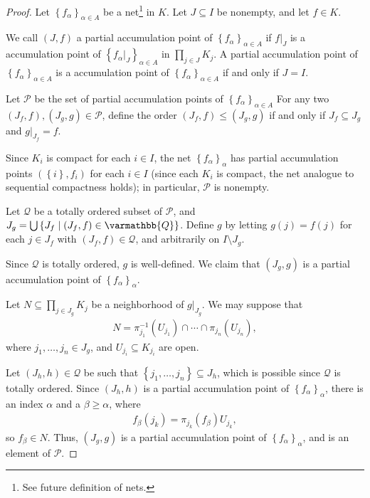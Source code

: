 \documentclass[12pt]{extarticle}
\newcommand{\Q}{\mathbb{Q}}
\newcommand{\set}[1]{\left\{#1\right\}}
\theoremstyle{plain}
\theoremstyle{definition}
\theoremstyle{note}
\renewcommand*{\mathbb}[1]{\varmathbb{#1}}
\renewcommand{\newline}{\hfill\break}
\begin{document}
\begin{proof}
  Let $\set{f_{\alpha}}_{\alpha\in A}$ be a net\footnote{See future definition of nets.} in $K$. Let $J\subseteq I$ be nonempty, and let $f\in K$.\newline

  We call $\left(J,f\right)$ a partial accumulation point of $\set{f_{\alpha}}_{\alpha \in A}$ if $f\vert_{J}$ is a accumulation point of $\set{f_{\alpha}\vert_{J}}_{\alpha \in A}$ in $\displaystyle \prod_{j\in J}K_j$. A partial accumulation point of $\set{f_{\alpha}}_{\alpha \in A}$ is a accumulation point of $\set{f_{\alpha}}_{\alpha\in A}$  if and only if $J = I$.\newline

  Let $\mathcal{P}$ be the set of partial accumulation points of $\set{f_{\alpha}}_{\alpha \in A}$ For any two $\left(J_f,f\right),\left(J_g,g\right)\in \mathcal{P}$, define the order $\left(J_f,f\right)\leq \left(J_g,g\right)$ if and only if $J_f\subseteq J_g$ and $g\vert_{J_f} = f$.\newline

  Since $K_i$ is compact for each $i\in I$, the net $\set{f_{\alpha}}_{\alpha}$ has partial accumulation points $\left(\set{i},f_i\right)$ for each $i\in I$ (since each $K_i$ is compact, the net analogue to sequential compactness holds); in particular, $\mathcal{P}$ is nonempty.\newline

  Let $\mathcal{Q}$ be a totally ordered subset of $\mathcal{P}$, and $J_g = \bigcup\set{J_f\mid \left(J_f,f\right)\in \Q}$. Define $g$ by letting $g(j) = f(j)$ for each $j\in J_f$ with $\left(J_f,f\right)\in \mathcal{Q}$, and arbitrarily on $I\setminus J_g$.\newline

  Since $\mathcal{Q}$ is totally ordered, $g$ is well-defined. We claim that $\left(J_g,g\right)$ is a partial accumulation point of $\set{f_{\alpha}}_{\alpha}$.\newline

  Let $\displaystyle N\subseteq \prod_{j\in J_g} K_j$ be a neighborhood of $g\vert_{J_g}$. We may suppose that
  \begin{align*}
    N = \pi_{j_1}^{-1}\left(U_{j_1}\right) \cap \cdots \cap \pi_{j_n}\left(U_{j_n}\right),
  \end{align*}
  where $j_1,\dots,j_n\in J_g$, and $U_{j_i} \subseteq K_{j_i}$ are open.\newline

  Let $\left(J_{h},h\right)\in \mathcal{Q}$ be such that $\set{j_1,\dots,j_n}\subseteq J_h$, which is possible since $\mathcal{Q}$ is totally ordered. Since $\left(J_h,h\right)$ is a partial accumulation point of $\set{f_{\alpha}}_{\alpha}$, there is an index $\alpha$ and a $\beta \geq \alpha$, where
  \begin{align*}
    f_{\beta}\left(j_k\right) = \pi_{j_k}\left(f_{\beta}\right)U_{j_k},
  \end{align*}
  so $f_{\beta}\in N$. Thus, $\left(J_g,g\right)$ is a partial accumulation point of $\set{f_{\alpha}}_{\alpha}$, and is an element of $\mathcal{P}$.\newline


\end{proof}
\end{document}
